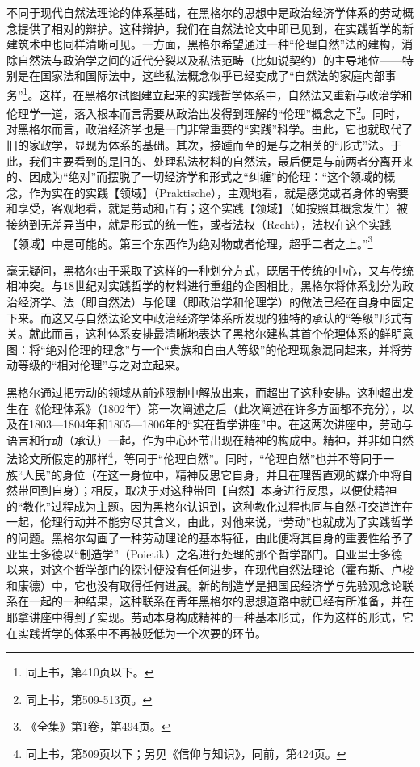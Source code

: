 不同于现代自然法理论的体系基础，在黑格尔的思想中是政治经济学体系的劳动概念提供了相对的辩护。这种辩护，我们在自然法论文中即已见到，在实践哲学的新建筑术中也同样清晰可见。一方面，黑格尔希望通过一种“伦理自然”法的建构，消除自然法与政治学之间的近代分裂以及私法范畴（比如说契约）的主导地位——特别是在国家法和国际法中，这些私法概念似乎已经变成了“自然法的家庭内部事务”\footnote{同上书，第410页以下。}。这样，在黑格尔试图建立起来的实践哲学体系中，自然法又重新与政治学和伦理学一道，落入根本而言需要从政治出发得到理解的“伦理”概念之下\footnote{同上书，第509-513页。}。同时，对黑格尔而言，政治经济学也是一门非常重要的“实践”科学。由此，它也就取代了旧的家政学，显现为体系的基础。其次，接踵而至的是与之相关的“形式”法。于此，我们主要看到的是旧的、处理私法材料的自然法，最后便是与前两者分离开来的、因成为“绝对”而摆脱了一切经济学和形式之“纠缠”的伦理：“这个领域的概念，作为实在的实践【领域】（Praktische），主观地看，就是感觉或者身体的需要和享受，客观地看，就是劳动和占有；这个实践【领域】（如按照其概念发生）被接纳到无差异当中，就是形式的统一性，或者法权（Recht），法权在这个实践【领域】中是可能的。第三个东西作为绝对物或者伦理，超乎二者之上。”\footnote{《全集》第1卷，第494页。}

毫无疑问，黑格尔由于采取了这样的一种划分方式，既居于传统的中心，又与传统相冲突。与18世纪对实践哲学的材料进行重组的企图相比，黑格尔将体系划分为政治经济学、法（即自然法）与伦理（即政治学和伦理学）的做法已经在自身中固定下来。而这又与自然法论文中政治经济学体系所发现的独特的承认的“等级”形式有关。就此而言，这种体系安排最清晰地表达了黑格尔建构其首个伦理体系的鲜明意图：将“绝对伦理的理念”与一个“贵族和自由人等级”的伦理现象混同起来，并将劳动等级的“相对伦理”与之对立起来。

黑格尔通过把劳动的领域从前述限制中解放出来，而超出了这种安排。这种超出发生在《伦理体系》（1802年）第一次阐述之后（此次阐述在许多方面都不充分），以及在1803—1804年和1805—1806年的“实在哲学讲座”中。在这两次讲座中，劳动与语言和行动（承认）一起，作为中心环节出现在精神的构成中。精神，并非如自然法论文所假定的那样\footnote{同上书，第509页以下；另见《信仰与知识》，同前，第424页。}，等同于“伦理自然”。同时，“伦理自然”也并不等同于一族“人民”的身位（在这一身位中，精神反思它自身，并且在理智直观的媒介中将自然带回到自身）；相反，取决于对这种带回【自然】本身进行反思，以便使精神的“教化”过程成为主题。因为黑格尔认识到，这种教化过程也同与自然打交道连在一起，伦理行动并不能穷尽其含义，由此，对他来说，“劳动”也就成为了实践哲学的问题。黑格尔勾画了一种劳动理论的基本特征，由此便将其自身的重要性给予了亚里士多德以“制造学”（Poietik）之名进行处理的那个哲学部门。自亚里士多德以来，对这个哲学部门的探讨便没有任何进步，在现代自然法理论（霍布斯、卢梭和康德）中，它也没有取得任何进展。新的制造学是把国民经济学与先验观念论联系在一起的一种结果，这种联系在青年黑格尔的思想道路中就已经有所准备，并在耶拿讲座中得到了实现。劳动本身构成精神的一种基本形式，作为这样的形式，它在实践哲学的体系中不再被贬低为一个次要的环节。

